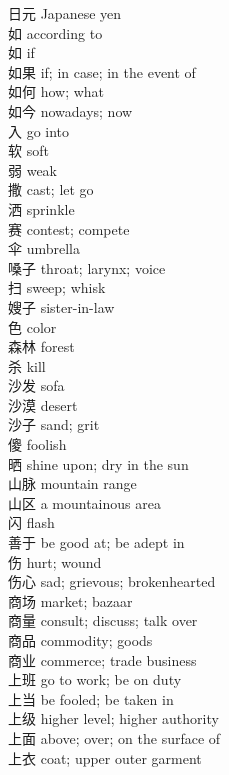 日元 \quad Japanese yen\\
如 \quad according to\\
如 \quad if\\
如果 \quad if; in case; in the event of\\
如何 \quad how; what\\
如今 \quad nowadays; now\\
入 \quad go into\\
软 \quad soft\\
弱 \quad weak\\
撒 \quad cast; let go\\
洒 \quad sprinkle\\
赛 \quad contest; compete\\
伞 \quad umbrella\\
嗓子 \quad throat; larynx; voice\\
扫 \quad sweep; whisk\\
嫂子 \quad sister-in-law\\
色 \quad color\\
森林 \quad forest\\
杀 \quad kill\\
沙发 \quad sofa\\
沙漠 \quad desert\\
沙子 \quad sand; grit\\
傻 \quad foolish\\
晒 \quad shine upon; dry in the sun\\
山脉 \quad mountain range\\
山区 \quad a mountainous area\\
闪 \quad flash\\
善于 \quad be good at; be adept in\\
伤 \quad hurt; wound\\
伤心 \quad sad; grievous; brokenhearted\\
商场 \quad market; bazaar\\
商量 \quad consult; discuss; talk over\\
商品 \quad commodity; goods\\
商业 \quad commerce; trade business\\
上班 \quad go to work; be on duty\\
上当 \quad be fooled; be taken in\\
上级 \quad higher level; higher authority\\
上面 \quad above; over; on the surface of\\
上衣 \quad coat; upper outer garment\\
